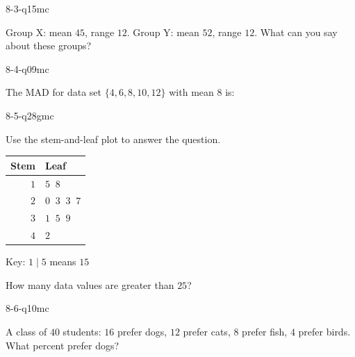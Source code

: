 \begin{practiceQuestion}{8-3-q15}{mc}
\begin{questionText}
Group X: mean $45$, range $12$. Group Y: mean $52$, range $12$. What can you say about these groups?
\end{questionText}
\end{practiceQuestion}

\begin{practiceQuestion}{8-4-q09}{mc}
\begin{questionText}
The MAD for data set $\{4, 6, 8, 10, 12\}$ with mean $8$ is:
\end{questionText}
\end{practiceQuestion}

\begin{practiceQuestion}{8-5-q28}{gmc}
\begin{questionText}
Use the stem-and-leaf plot to answer the question.

\begin{center}
\begin{tabular}{r|l}
\textbf{Stem} & \textbf{Leaf} \\
\hline
$1$ & $5\;\;8$ \\
$2$ & $0\;\;3\;\;3\;\;7$ \\
$3$ & $1\;\;5\;\;9$ \\
$4$ & $2$
\end{tabular}

Key: $1 \mid 5$ means $15$
\end{center}

How many data values are greater than $25$?
\end{questionText}
\end{practiceQuestion}

\begin{practiceQuestion}{8-6-q10}{mc}
\begin{questionText}
A class of $40$ students: $16$ prefer dogs, $12$ prefer cats, $8$ prefer fish, $4$ prefer birds. What percent prefer dogs?
\end{questionText}
\end{practiceQuestion}

